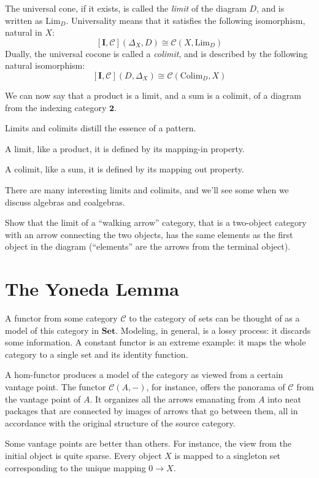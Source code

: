 \documentclass[DaoFP]{subfiles}
\begin{document}
The universal cone, if it exists, is called the \emph{limit} of the diagram $D$, and is written as $\text{Lim}_D$. Universality means that it satisfies the following isomorphism, natural in $X$:
\[ [\mathbf{I}, \mathcal{C}](\Delta_X, D)  \cong \mathcal{C}(X, \text{Lim}_D) \]
Dually, the universal cocone is called a \emph{colimit}, and is described by the following natural isomorphism:
\[ [\mathbf{I}, \mathcal{C}](D, \Delta_X)  \cong \mathcal{C}( \text{Colim}_D, X) \]

We can now say that a product is a limit, and a sum is a colimit, of a diagram from the indexing category $\mathbf{2}$.

Limits and colimits distill the essence of a pattern. 

A limit, like a product, it is defined by its mapping-in property. 

A colimit, like a sum, it is defined by its mapping out property.

There are many interesting limits and colimits, and we'll see some when we discuss algebras and coalgebras.

\begin{exercise}
Show that the limit of a ``walking arrow'' category, that is a two-object category with an arrow connecting the two objects, has the same elements as the first object in the diagram (``elements'' are the arrows from the terminal object).
\end{exercise}

\section{The Yoneda Lemma}

A functor from some category $\mathcal{C}$ to the category of sets can be thought of as a model of this category in $\mathbf{Set}$. Modeling, in general, is a lossy process: it discards some information. A constant functor is an extreme example: it maps the whole category to a single set and its identity function. 

A hom-functor produces a model of the category as viewed from a certain vantage point. The functor $\mathcal{C}(A, -)$, for instance, offers the panorama of $\mathcal{C}$ from the vantage point of $A$. It organizes all the arrows emanating from $A$ into neat packages that are connected by images of arrows that go between them, all in accordance with the original structure of the source category. 

Some vantage points are better than others. For instance, the view from the initial object is quite sparse. Every object $X$ is mapped to a singleton set corresponding to the unique mapping $0 \to X$. 
\end{document}
